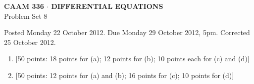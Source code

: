 \documentclass[10pt]{article}
\begin{document}

\begin{center}
\large \textsf{\textbf{CAAM 336 $\cdot$ DIFFERENTIAL EQUATIONS}\\[0.5em]
 Problem Set 8 }
\end{center}

Posted Monday 22 October 2012.  Due Monday 29 October 2012, 5pm.
Corrected 25 October 2012.

\begin{enumerate}
\item {[50 points: 18 points for (a); 12 points for (b); 10 points each for (c) and (d)]}\\  

\item {[50 points: 12 points for (a) and (b); 16 points for (c); 10 points for (d)]}\\  
\end{enumerate}
\end{document}
